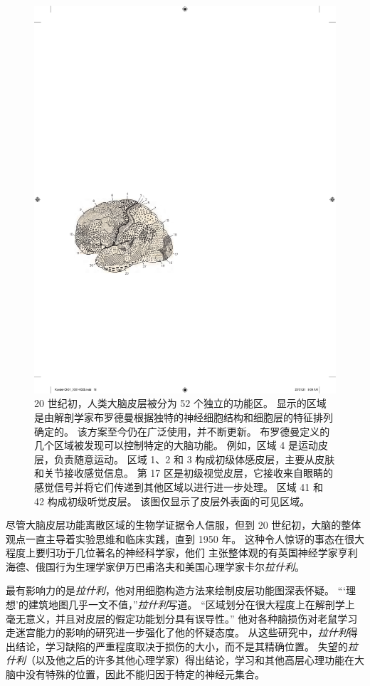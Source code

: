 \begin{figure}[htbp]
	\centering
	\includegraphics[width=0.65\linewidth]{chap01/fig_1_7}
	\caption{20 世纪初，人类大脑皮层被分为 52 个独立的功能区。
		显示的区域是由解剖学家布罗德曼根据独特的神经细胞结构和细胞层的特征排列确定的。
		该方案至今仍在广泛使用，并不断更新。
		布罗德曼定义的几个区域被发现可以控制特定的大脑功能。
		例如，区域 4 是运动皮层，负责随意运动。
		区域 1、2 和 3 构成初级体感皮层，主要从皮肤和关节接收感觉信息。
		第 17 区是初级视觉皮层，它接收来自眼睛的感觉信号并将它们传递到其他区域以进行进一步处理。
		区域 41 和 42 构成初级听觉皮层。
		该图仅显示了皮层外表面的可见区域。}
	\label{fig:1_7}
\end{figure}


尽管大脑皮层功能离散区域的生物学证据令人信服，但到 20 世纪初，大脑的整体观点一直主导着实验思维和临床实践，直到 1950 年。
这种令人惊讶的事态在很大程度上要归功于几位著名的神经科学家，他们 主张整体观的有英国神经学家亨利海德、俄国行为生理学家伊万巴甫洛夫和美国心理学家卡尔\textit{拉什利}。


最有影响力的是\textit{拉什利}，他对用细胞构造方法来绘制皮层功能图深表怀疑。
“‘理想’的建筑地图几乎一文不值，”\textit{拉什利}写道。
“区域划分在很大程度上在解剖学上毫无意义，并且对皮层的假定功能划分具有误导性。” 
他对各种脑损伤对老鼠学习走迷宫能力的影响的研究进一步强化了他的怀疑态度。
从这些研究中，\textit{拉什利}得出结论，学习缺陷的严重程度取决于损伤的大小，而不是其精确位置。
失望的\textit{拉什利}（以及他之后的许多其他心理学家）得出结论，学习和其他高层心理功能在大脑中没有特殊的位置，因此不能归因于特定的神经元集合。


